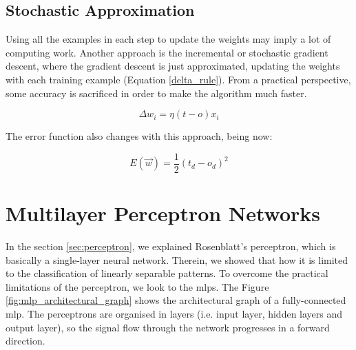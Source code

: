 	\clearpage

	\subsection{Stochastic Approximation}
	Using all the examples in each step to update the weights may imply a lot of computing work. Another approach is the incremental or stochastic gradient descent, where the gradient descent is just approximated, updating the weights with each training example (Equation \ref{delta_rule}). From a practical perspective, some accuracy is sacrificed in order to make the algorithm much faster.

	\begin{equation}
		\label{delta_rule}
		\Delta w_{i}= \eta (t - o) x_{i}
	\end{equation}

	The error function also changes with this approach, being now:

	\begin{equation}
		\label{error_function_stoc_square}
		E(\vec{w}) = \frac{1}{2} (t_d-o_d)^2 
	\end{equation}



                                                                              

\section{Multilayer Perceptron Networks}
In the section \ref{sec:perceptron}, we explained Rosenblatt’s perceptron, which is basically a single-layer neural network. Therein, we showed that how it is limited to the classification of linearly separable patterns. To overcome the practical limitations of the perceptron, we look to the \glspl{mlp}. The Figure \ref{fig:mlp_architectural_graph} shows the architectural graph of a fully-connected \gls{mlp}. The perceptrons are organised in layers (i.e. input layer, hidden layers and output layer), so the signal flow through the network progresses in a forward direction.

